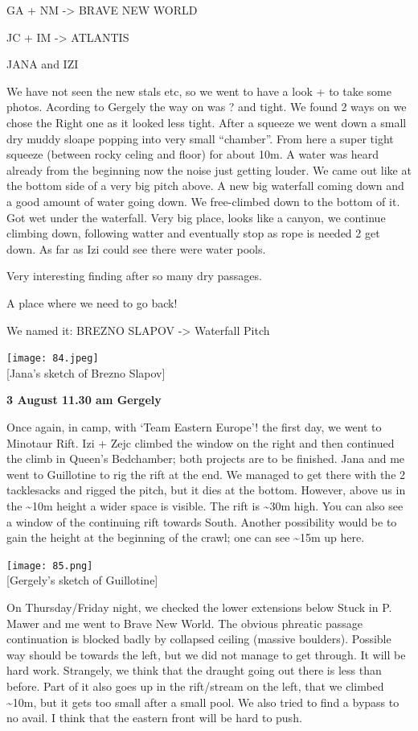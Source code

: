GA + NM -\textgreater{} BRAVE NEW WORLD

JC + IM -\textgreater{} ATLANTIS

JANA and IZI

We have not seen the new stals etc, so we went to have a look + to take
some photos. Acording to Gergely the way on was ? and tight. We found 2
ways on we chose the Right one as it looked less tight. After a squeeze
we went down a small dry muddy sloape popping into very small
``chamber''. From here a super tight squeeze (between rocky celing and
floor) for about 10m. A water was heard already from the beginning now
the noise just getting louder. We came out like at the bottom side of a
very big pitch above. A new big waterfall coming down and a good amount
of water going down. We free-climbed down to the bottom of it. Got wet
under the waterfall. Very big place, looks like a canyon, we continue
climbing down, following watter and eventually stop as rope is needed 2
get down. As far as Izi could see there were water pools.

Very interesting finding after so many dry passages.

A place where we need to go back!

We named it: BREZNO SLAPOV -\textgreater{} Waterfall Pitch

\texttt{[image: 84.jpeg]}\\
{[}Jana's sketch of Brezno Slapov{]}

\textbf{3 August 11.30 am Gergely}

Once again, in camp, with `Team Eastern Europe'! the first day, we went
to Minotaur Rift. Izi + Zejc climbed the window on the right and then
continued the climb in Queen's Bedchamber; both projects are to be
finished. Jana and me went to Guillotine to rig the rift at the end. We
managed to get there with the 2 tacklesacks and rigged the pitch, but it
dies at the bottom. However, above us in the \textasciitilde{}10m height
a wider space is visible. The rift is \textasciitilde{}30m high. You can
also see a window of the continuing rift towards South. Another
possibility would be to gain the height at the beginning of the crawl;
one can see \textasciitilde{}15m up here.

\texttt{[image: 85.png]}\\
{[}Gergely's sketch of Guillotine{]}

On Thursday/Friday night, we checked the lower extensions below Stuck in
P. Mawer and me went to Brave New World. The obvious phreatic passage
continuation is blocked badly by collapsed ceiling (massive boulders).
Possible way should be towards the left, but we did not manage to get
through. It will be hard work. Strangely, we think that the draught
going out there is less than before. Part of it also goes up in the
rift/stream on the left, that we climbed \textasciitilde{}10m, but it
gets too small after a small pool. We also tried to find a bypass to no
avail. I think that the eastern front will be hard to push.

